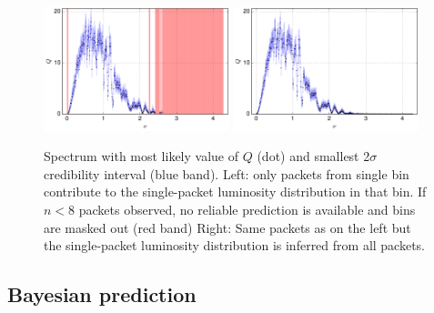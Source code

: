 \documentclass[11pt]{article}
\begin{document}
\begin{figure}[ht]
  \centering
  \includegraphics[width=0.48\textwidth]{spectrum_bin}
  \includegraphics[width=0.48\textwidth]{spectrum_all}
  \caption{Spectrum with most likely value of $Q$ (dot) and smallest
    2$\sigma$ credibility interval (blue band). Left: only packets
    from single bin contribute to the single-packet luminosity
    distribution in that bin. If $n<8$ packets observed, no reliable
    prediction is available and bins are masked out (red band) Right:
    Same packets as on the left but the single-packet luminosity
    distribution is inferred from all packets. }
\label{fig:spectrum}
\end{figure}


\subsection{Bayesian prediction}
\label{sec:bayp}
\end{document}
